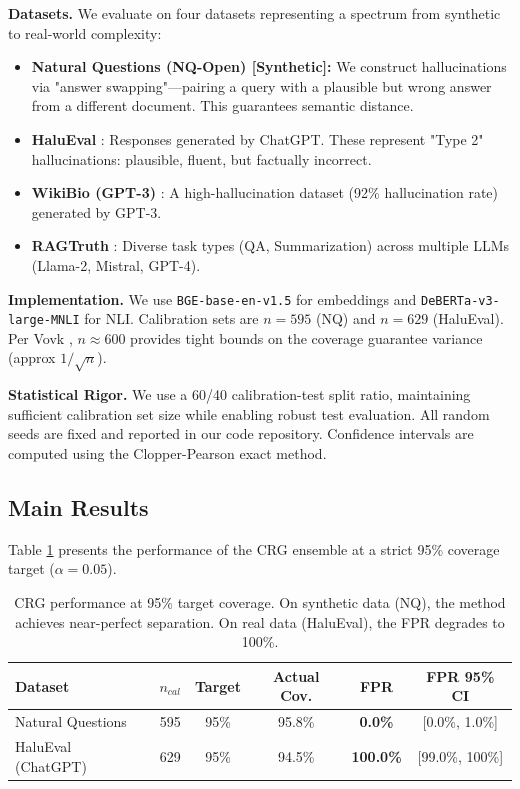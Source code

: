 \documentclass[11pt]{article}
\begin{document}
\textbf{Datasets.} We evaluate on four datasets representing a spectrum from synthetic to real-world complexity:
\begin{itemize}
    \item \textbf{Natural Questions (NQ-Open) [Synthetic]:} We construct hallucinations via "answer swapping"---pairing a query with a plausible but wrong answer from a different document. This guarantees semantic distance.
    \item \textbf{HaluEval} \cite{li2023halueval}: Responses generated by ChatGPT. These represent "Type 2" hallucinations: plausible, fluent, but factually incorrect.
    \item \textbf{WikiBio (GPT-3)} \cite{manakul2023selfcheckgpt}: A high-hallucination dataset (92\% hallucination rate) generated by GPT-3.
    \item \textbf{RAGTruth} \cite{wang2023ragtruth}: Diverse task types (QA, Summarization) across multiple LLMs (Llama-2, Mistral, GPT-4).
\end{itemize}

\textbf{Implementation.} We use \texttt{BGE-base-en-v1.5} for embeddings and \texttt{DeBERTa-v3-large-MNLI} for NLI. Calibration sets are $n=595$ (NQ) and $n=629$ (HaluEval). Per Vovk \cite{vovk2005algorithmic}, $n \approx 600$ provides tight bounds on the coverage guarantee variance (approx $1/\sqrt{n}$).

\textbf{Statistical Rigor.} We use a 60/40 calibration-test split ratio, maintaining sufficient calibration set size while enabling robust test evaluation. All random seeds are fixed and reported in our code repository. Confidence intervals are computed using the Clopper-Pearson exact method.

\subsection{Main Results}

Table \ref{tab:main_results} presents the performance of the CRG ensemble at a strict 95\% coverage target ($\alpha=0.05$).

\begin{table}[htbp]
\centering
\caption{CRG performance at 95\% target coverage. On synthetic data (NQ), the method achieves near-perfect separation. On real data (HaluEval), the FPR degrades to 100\%.}
\label{tab:main_results}
\begin{tabular}{lccccc}
\toprule
\textbf{Dataset} & \textbf{$n_{cal}$} & \textbf{Target} & \textbf{Actual Cov.} & \textbf{FPR} & \textbf{FPR 95\% CI} \\
\midrule
Natural Questions & 595 & 95\% & 95.8\% & \textbf{0.0\%} & [0.0\%, 1.0\%] \\
HaluEval (ChatGPT) & 629 & 95\% & 94.5\% & \textbf{100.0\%} & [99.0\%, 100\%] \\
\bottomrule
\end{tabular}
\end{table}
\end{document}
